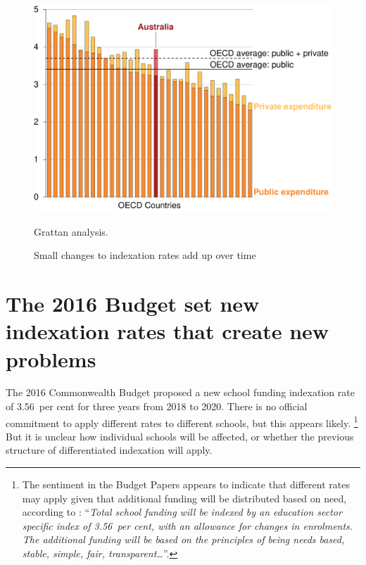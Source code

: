 \documentclass{grattan}
\begin{document}
\begin{figure}
\caption{Small changes to indexation rates add up over time}\label{fig:legis-locks-in-indexation-rates-too-high}

\includegraphics[page=9]{atlas/Charts.pdf}

{Grattan analysis.}
\end{figure}

\section{The 2016 Budget set new indexation rates that create new problems}\label{sec:the-2016-budget-set-new-indexation-rates-that-create-new-problems}

The 2016 Commonwealth Budget proposed a new school funding indexation rate of 3.56~per cent for three years from 2018 to 2020.
There is no official commitment to apply different rates to different schools, but this appears likely.%
\footnote{The sentiment in the Budget Papers appears to indicate that different rates may apply given that additional funding will be distributed based on need, according to \textcite[][No.~2, p.~80]{Treasury2016BudgetPapers2016}: ``\emph{Total school funding will be indexed by an education sector specific index of 3.56~per cent, with an allowance for changes in enrolments.
The additional funding will be based on the principles of being needs based, stable, simple, fair, transparent\dots}''.}
But it is unclear how individual schools will be affected, or whether the previous structure of differentiated indexation will apply.
\end{document}
